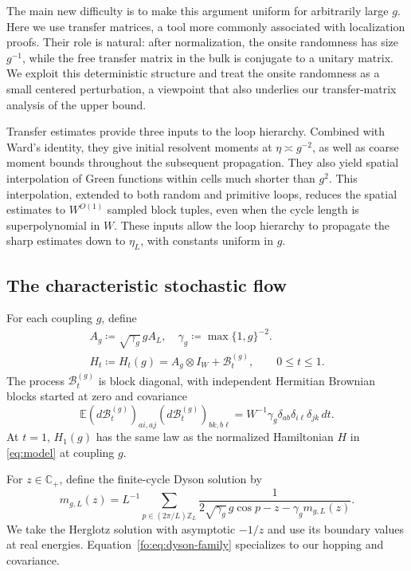 \documentclass[11pt]{article}
\numberwithin{equation}{section}
\theoremstyle{remark}
\newcommand{\E}{\mathbb E}
\newcommand{\Z}{\mathbb Z}
\newcommand{\C}{\mathbb C}
\begin{document}
The main new difficulty is to make this argument uniform for arbitrarily
large $g$. Here we use transfer matrices, a tool more commonly associated
with localization proofs. Their role is natural: after normalization, the
onsite randomness has size $g^{-1}$, while the free transfer matrix in the
bulk is conjugate to a unitary matrix. We exploit this deterministic
structure and treat the onsite randomness as a small centered perturbation,
a viewpoint that also underlies our transfer-matrix analysis of the upper
bound.

Transfer estimates provide three inputs to the loop hierarchy. Combined
with Ward's identity, they give initial resolvent moments at
$\eta\asymp g^{-2}$, as well as coarse moment bounds throughout the subsequent
propagation. They also yield spatial interpolation of Green functions within
cells much shorter than $g^2$. This interpolation, extended to both random
and primitive loops, reduces the spatial estimates to $W^{O(1)}$ sampled
block tuples, even when the cycle length is superpolynomial in $W$. These
inputs allow the loop hierarchy to propagate the sharp estimates down to
$\eta_L$, with constants uniform in $g$.

\subsection{The characteristic stochastic flow}
\label{sec:fo-characteristic}
 For each coupling $g$, define
\begin{equation}\label{fo:eq:flow}
 \begin{gathered}
 A_g\coloneqq\sqrt{\gamma_g}\,gA_L,\quad \gamma_g\coloneqq\max\{1,g\}^{-2}.\\
 H_t\coloneqq H_t(g)=A_g\otimes I_W+\mathcal B_t^{(g)},\qquad 0\le t\le1.
 \end{gathered}
\end{equation}
The process $\mathcal B_t^{(g)}$ is block diagonal, with independent
Hermitian Brownian blocks started at zero and covariance
\[
 \E(d\mathcal B_t^{(g)})_{ai,aj}(d\mathcal B_t^{(g)})_{bk,b\ell}
   =W^{-1}\gamma_g\delta_{ab}\delta_{i\ell}\delta_{jk}\,dt.
\]
At $t=1$, $H_1(g)$ has the same law as the normalized Hamiltonian $H$
in \eqref{eq:model} at coupling $g$.

For $z\in\C_+$, define the finite-cycle Dyson solution by
\begin{equation}\label{fo:eq:dyson-family}
 m_{g,L}(z)=L^{-1}\sum_{p\in(2\pi/L)\Z_L}
       \frac1{2\sqrt{\gamma_g}\,g\cos p-z-\gamma_g m_{g,L}(z)}.
\end{equation}
We take the Herglotz solution with asymptotic $-1/z$ and use its
boundary values at real energies. Equation~\eqref{fo:eq:dyson-family}
specializes \cite[(3.2)--(3.4)]{TYY} to our hopping and covariance.
\end{document}
